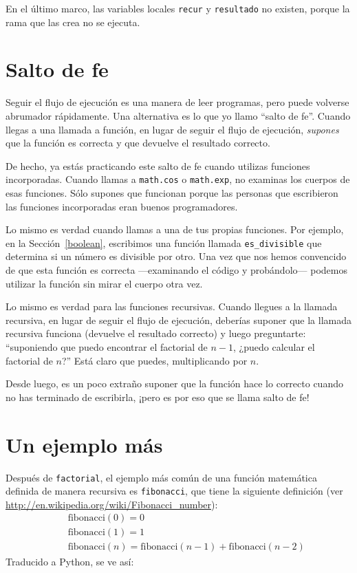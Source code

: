 \documentclass[10pt]{book}
\begin{document}
En el último marco, las variables
locales {\tt recur} y {\tt resultado} no existen, porque
la rama que las crea no se ejecuta.


\section{Salto de fe}

Seguir el flujo de ejecución es una manera de leer programas, pero
puede volverse abrumador rápidamente.  Una
alternativa es lo que yo llamo ``salto de fe''.  Cuando llegas a una
llamada a función, en lugar de seguir el flujo de ejecución, {\em
supones} que la función es correcta y que devuelve el resultado
correcto.

De hecho, ya estás practicando este salto de fe cuando utilizas
funciones incorporadas.  Cuando llamas a {\tt math.cos} o {\tt math.exp},
no examinas los cuerpos de esas funciones.  Sólo
supones que funcionan porque las personas que escribieron las funciones
incorporadas eran buenos programadores.

Lo mismo es verdad cuando llamas a una de tus propias funciones.  Por
ejemplo, en la Sección~\ref{boolean}, escribimos una función llamada
\verb"es_divisible" que determina si un número es divisible por
otro.  Una vez que nos hemos convencido de que esta función es
correcta ---examinando el código y probándolo--- podemos utilizar la función
sin mirar el cuerpo otra vez.

Lo mismo es verdad para las funciones recursivas.  Cuando llegues a la llamada
recursiva, en lugar de seguir el flujo de ejecución, deberías suponer
que la llamada recursiva funciona (devuelve el resultado correcto) y luego
preguntarte: ``suponiendo que puedo encontrar el factorial de $n-1$, ¿puedo
calcular el factorial de $n$?''  Está claro que
puedes, multiplicando por $n$.

Desde luego, es un poco extraño suponer que la función hace lo
correcto cuando no has terminado de escribirla, ¡pero es por eso
que se llama salto de fe!


\section{Un ejemplo más}
\label{one.more.example}

Después de {\tt factorial}, el ejemplo más común de una función
matemática definida de manera recursiva es {\tt fibonacci}, que tiene la
siguiente definición (ver
  \url{http://en.wikipedia.org/wiki/Fibonacci_number}):
%
\begin{eqnarray*}
&& \mathrm{fibonacci}(0) = 0 \\
&& \mathrm{fibonacci}(1) = 1 \\
&& \mathrm{fibonacci}(n) = \mathrm{fibonacci}(n-1) + \mathrm{fibonacci}(n-2)
\end{eqnarray*}
%
Traducido a Python, se ve así:
\end{document}
